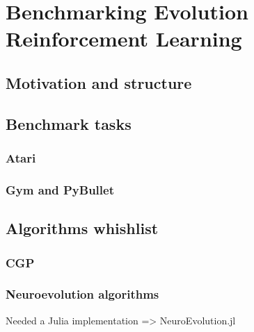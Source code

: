 \chapter{Benchmarking Evolution Reinforcement Learning}
\label{sec:berl}

\section{Motivation and structure}

\section{Benchmark tasks}
\subsection{Atari}

\subsection{Gym and PyBullet}

\section{Algorithms whishlist}
\subsection{CGP}
\subsection{Neuroevolution algorithms}
Needed a Julia implementation => NeuroEvolution.jl

